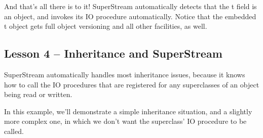 \documentclass{report}
\begin{document}
And that's all there is to it! SuperStream automatically detects that the t
field is an object, and invokes its IO procedure automatically. Notice that
the embedded t object gets full object versioning and all other facilities,
as well.

\subsection{Lesson 4 -- Inheritance and SuperStream}

SuperStream automatically handles most inheritance issues, because it knows
how to call the IO procedures that are registered for any superclasses of an
object being read or written.

In this example, we'll demonstrate a simple inheritance situation, and a
slightly more complex one, in which we don't want the superclass' IO
procedure to be called.
\end{document}
